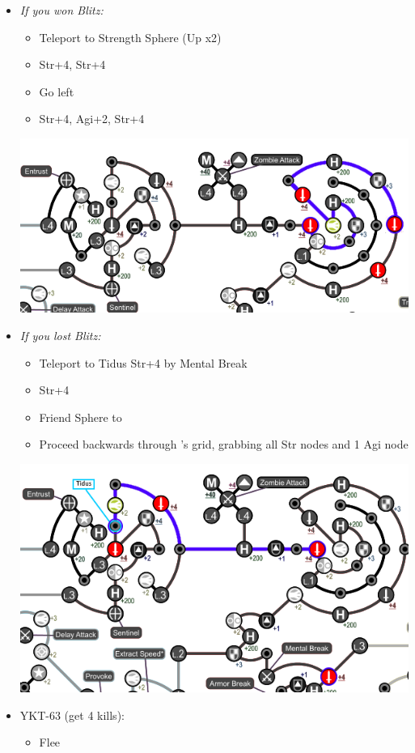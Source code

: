 \begin{spheregrid}
\begin{itemize}
	\yunaf
	\item \textit{If you won Blitz:}
	\begin{itemize}
		\item Teleport to Strength Sphere (Up x2)
		\item Str+4, Str+4
		\item Go left
		\item Str+4, Agi+2, Str+4
	\end{itemize}
	\includegraphics[width=.9\columnwidth]{graphics/Yuna_blitz_win_highroad}
	\item \textit{If you lost Blitz:}
	\begin{itemize}
		\item Teleport to Tidus Str+4 by Mental Break
		\item Str+4
		\item Friend Sphere to \tidus
		\item Proceed backwards through \auron's grid, grabbing all Str nodes and 1 Agi node
	\end{itemize}
	\includegraphics[width=.9\columnwidth]{graphics/Yuna_blitz_lose_highroad}
\end{itemize}
\end{spheregrid}
\begin{encounters}
\begin{itemize}
	\item YKT-63 (get 4 kills):
	\begin{itemize}
		\tidusf Attack
		\yunaf Attack
		\item Flee
	\end{itemize}
\end{itemize}
\end{encounters}
